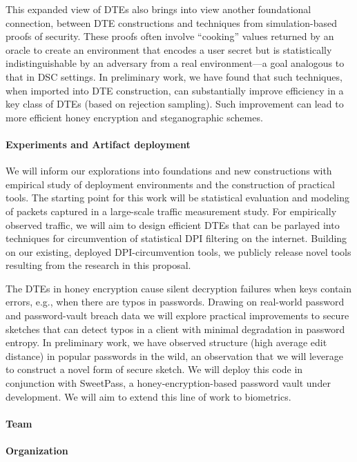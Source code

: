 \documentclass[10pt]{article}
\begin{document}
This expanded view of DTEs also brings into view another foundational connection, between DTE constructions and techniques from simulation-based proofs of security. These proofs often involve ``cooking'' values returned by an oracle to create an environment that encodes a user secret but is statistically indistinguishable by an adversary from a real environment---a goal analogous to that in DSC settings. In preliminary work, we have found that such techniques, when imported into DTE construction, can substantially improve efficiency in a key class of DTEs (based on rejection sampling). Such improvement can lead to more efficient honey encryption and steganographic schemes.

\paragraph{Experiments and Artifact deployment} We will inform our explorations into  foundations and new constructions with empirical study of deployment environments and the construction of practical tools. The starting point for this work will be statistical evaluation and modeling of packets captured in a large-scale traffic measurement study. For empirically observed traffic, we will aim to design efficient DTEs that can be parlayed into techniques for circumvention of statistical DPI filtering on the internet. Building on our existing, deployed DPI-circumvention tools, we publicly release novel tools resulting from the research in this proposal.

The DTEs in honey encryption cause silent decryption failures when keys contain errors, e.g., when there are typos in passwords. 
Drawing on real-world password and password-vault breach data we will explore practical improvements to secure sketches that can detect typos in a client with minimal degradation in password entropy. In preliminary work, we have observed structure (high average edit distance) in popular passwords in the wild, an observation that we will leverage to construct a novel form of secure sketch. We will deploy this code in conjunction with SweetPass, a honey-encryption-based password vault under development. We will aim to extend this line of work to biometrics. 


\paragraph{Team}


\paragraph{Organization}
\end{document}
